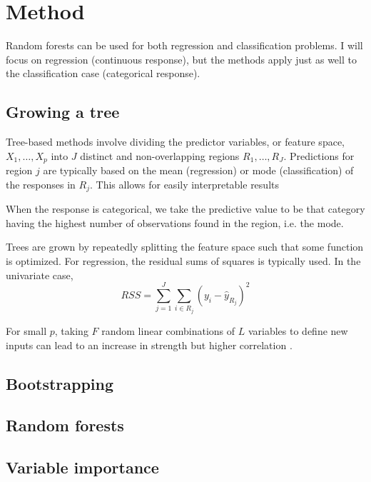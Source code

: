 \section{Method}

Random forests can be used for both regression and classification problems. I will focus on regression (continuous response), but the methods apply just as well to the classification case (categorical response).

\subsection{Growing a tree}

Tree-based methods involve dividing the predictor variables, or feature space, $X_1,\ldots,X_p$ into $J$ distinct and non-overlapping regions $R_1,\ldots,R_J$. Predictions for region $j$ are typically based on the mean (regression) or mode (classification) of the responses in $R_j$. This allows for easily interpretable results 

When the response is categorical, we take the predictive value to be that category having the highest number of observations found in the region, i.e. the mode.

Trees are grown by repeatedly splitting the feature space such that some function is optimized. For regression, the residual sums of squares is typically used. In the univariate case,
\[ RSS=\sum_{j=1}^J\sum_{i\in R_j}(y_i - \hat{y}_{R_j})^2 \]



For small $p$, taking $F$ random linear combinations of $L$ variables to define new inputs can lead to an increase in strength but higher correlation \citep{breiman:2001}. \cite{segal:2011} \cite{death:2002}

\subsection{Bootstrapping}


\subsection{Random forests}


\subsection{Variable importance}
